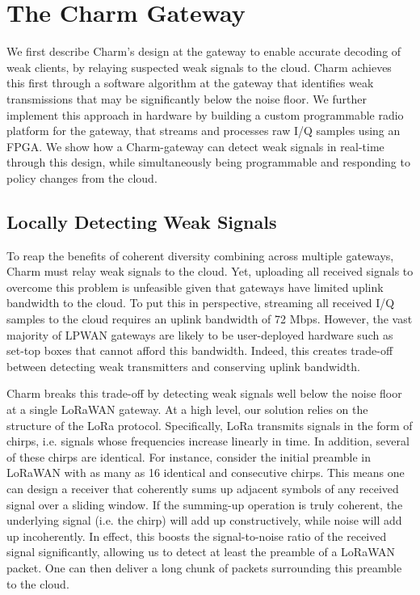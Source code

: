 \section{The Charm Gateway}
\label{sec:gateway}



We first describe Charm's design at the gateway to enable accurate decoding of
weak clients, by relaying suspected weak signals to the cloud. Charm achieves
this first through a software algorithm at the gateway that identifies weak
transmissions that may be significantly below the noise floor. We further
implement this approach in hardware by building a custom programmable radio
platform for the gateway, that streams and processes raw I/Q samples using an
FPGA. We show how a Charm-gateway can detect weak signals in real-time through
this design, while simultaneously being programmable and responding to policy
changes from the cloud.

\subsection{Locally Detecting Weak Signals}
\label{sec:local-detection}

To reap the benefits of coherent diversity combining across multiple gateways,
Charm must relay weak signals to the cloud. Yet,
uploading all received signals to overcome this problem is
unfeasible given that gateways have limited uplink bandwidth to the cloud. To
put this in perspective, streaming all received I/Q samples to the cloud
requires an uplink bandwidth of 72 Mbps. However, the vast
majority of LPWAN gateways are likely to be user-deployed hardware such as
set-top boxes that cannot afford this bandwidth. Indeed, this creates
trade-off between detecting weak transmitters and conserving uplink
bandwidth.

Charm breaks this trade-off by detecting weak signals well below the noise
floor at a single LoRaWAN gateway. At a high level, our solution relies on the
structure of the LoRa protocol. Specifically, LoRa transmits signals in
the form of chirps, i.e. signals whose frequencies increase linearly in time.
In addition, several of these chirps are identical. For instance, consider the
initial preamble  in LoRaWAN with as many as 16 identical and consecutive
chirps. This means one can design a receiver that coherently sums up adjacent
symbols of any received signal over a sliding window. If the summing-up
operation is truly coherent, the underlying signal (i.e. the chirp) will add
up constructively, while noise will add up incoherently. In effect, this
boosts the signal-to-noise ratio of the received signal significantly,
allowing us to detect at least the preamble of a LoRaWAN packet. One can then
deliver a long chunk of packets surrounding this preamble to the cloud.

